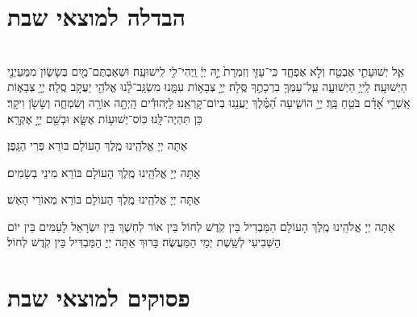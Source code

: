 \documentclass[twoside, openany, parskip=half, 11pt]{book}
\begin{document}
\section[הבדלה]{ הבדלה למוצאי שבת } \label{havdala}

\\
אֵ֧ל יְשׁוּעָתִ֛י אֶבְטַ֖ח וְלֹ֣א אֶפְחָ֑ד כִּֽי־עָזִּ֤י וְזִמְרָת֙ יָ֣הּ יְיָ֔ וַֽיְהִי־לִ֖י לִֽישׁוּעָֽה׃
וּשְׁאַבְתֶּם־מַ֖יִם בְּשָׂשׂ֑וֹן מִמַּעַיְנֵ֖י הַיְשׁוּעָֽה׃
לַֽייָ֥ הַיְשׁוּעָ֑ה עַֽל־עַמְּךָ֖ בִרְכָתֶ֣ךָ סֶּֽלָה׃
יְיָ֣ צְבָא֣וֹת עִמָּ֑נוּ מִשְׂגָּֽב־לָ֨נוּ אֱלֹהֵ֖י יַעֲקֹ֣ב סֶֽלָה׃
יְיָ֥ צְבָא֑וֹת אַֽשְׁרֵ֥י אָ֝דָ֗ם בֹּטֵ֥חַ בָּֽךְ׃
יְיָ֥ הוֹשִׁ֑יעָה הַ֝מֶּ֗לֶךְ יַעֲנֵ֥נוּ בְיוֹם־קׇרְאֵֽנוּ׃
לַיְּהוּדִ֕ים הָֽיְתָ֥ה אוֹרָ֖ה וְשִׂמְחָ֑ה וְשָׂשֹׂ֖ן וִיקָֽר׃ כֵּן תִּהְיֶה־לָּֽנוּ׃ כּֽוֹס־יְשׁוּע֥וֹת אֶשָּׂ֑א וּבְשֵׁ֖ם יְיָ֣ אֶקְרָֽא׃

\savri
{}
אַתָּה יְיָ אֱלֹהֵֽינוּ מֶֽלֶךְ הָעוֹלָם בּוֹרֵא פְּרִי הַגָּֽפֶן׃

אַתָּה יְיָ אֱלֹהֵֽינוּ מֶֽלֶךְ הָעוֹלָם בּוֹרֵא מִינֵי בְשָׂמִים׃

אַתָּה יְיָ אֱלֹהֵֽינוּ מֶֽלֶךְ הָעוֹלָם בּוֹרֵא מְאוֹרֵי הָאֵשׁ׃

אַתָּה יְיָ אֱלֹהֵֽינוּ מֶֽלֶךְ הָעוֹלָם הַמַּבְדִיל בֵּין קֹֽדֶשׁ לְחוֹל בֵּין אוֹר לְחֽשֶׁךְ בֵּין יִשְׂרָאֵל לָעַמִּים בֵּין יוֹם הַשְּׁבִיעִי לְשֵֽׁשֶׁת יְמֵי הַמַּעֲשֶׂה׃ בָּרוּךְ אַתָּה יְיָ הַמַּבְדִּיל בֵּין קֹֽדֶשׁ לְחוֹל׃

\section[פסוקים למוצ״ש]{ פסוקים למוצאי שבת }

\end{document}
